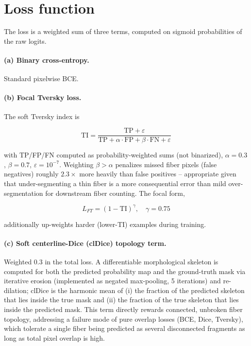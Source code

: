 \documentclass[11pt]{article}
\begin{document}
\section{Loss function}

The loss is a weighted sum of three terms, computed on sigmoid probabilities
of the raw logits.

\paragraph{(a) Binary cross-entropy.} Standard pixelwise BCE.

\paragraph{(b) Focal Tversky loss.}
The soft Tversky index is

\begin{equation}
\mathrm{TI} = \frac{\mathrm{TP} + \varepsilon}{\mathrm{TP} + \alpha\cdot\mathrm{FP} + \beta\cdot\mathrm{FN} + \varepsilon}
\label{eq:tversky}
\end{equation}

with TP/FP/FN computed as probability-weighted sums (not binarized),
$\alpha = 0.3$, $\beta = 0.7$, $\varepsilon = 10^{-7}$. Weighting
$\beta > \alpha$ penalizes missed fiber pixels (false negatives) roughly
$2.3\times$ more heavily than false positives -- appropriate given that
under-segmenting a thin fiber is a more consequential error than mild
over-segmentation for downstream fiber counting. The focal form,

\begin{equation}
L_{FT} = (1 - \mathrm{TI})^{\gamma}, \quad \gamma = 0.75
\label{eq:focal-tversky}
\end{equation}

additionally up-weights harder (lower-TI) examples during training.

\paragraph{(c) Soft centerline-Dice (clDice) topology term.}
Weighted 0.3 in the total loss. A differentiable morphological skeleton is
computed for both the predicted probability map and the ground-truth mask
via iterative erosion (implemented as negated max-pooling, 5 iterations) and
re-dilation; clDice is the harmonic mean of (i) the fraction of the
predicted skeleton that lies inside the true mask and (ii) the fraction of
the true skeleton that lies inside the predicted mask. This term directly
rewards connected, unbroken fiber topology, addressing a failure mode of pure
overlap losses (BCE, Dice, Tversky), which tolerate a single fiber being
predicted as several disconnected fragments as long as total pixel overlap is
high.
\end{document}
